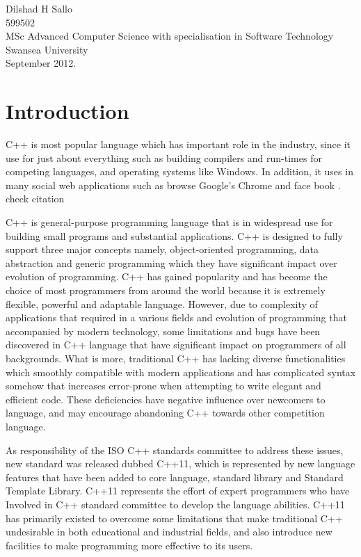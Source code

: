 \documentclass[11pt]{report}
\begin{document}
\begin{flushright}
Dilshad H Sallo\\
599502\\
MSc Advanced Computer Science with specialisation in Software Technology\\
Swansea University\\
September 2012.
\end{flushright}

\tableofcontents

\chapter{Introduction}
\label{cha:intro}
C++ is most popular language which has important role in the industry, since it use for just about everything such as building compilers and run-times for competing languages, and operating systems like Windows. In addition, it uses in many social web applications such as browse Google’s Chrome and face book \cite{ISO:2011:Cpplanguage}.
check citation

C++ is general-purpose programming language that is in widespread use for building small programs and substantial applications. C++ is designed to fully support three major concepts namely, object-oriented programming, data abstraction and generic programming which they have significant impact over evolution of programming. C++ has gained popularity and has become the choice of most programmers from around the world because it is extremely flexible, powerful and adaptable language. However, due to complexity of applications that required in a various fields and evolution of programming that accompanied by modern technology, some limitations and bugs have been discovered in C++ language that have significant impact on programmers of all backgrounds.  What is more, traditional C++ has lacking diverse functionalities which smoothly compatible with modern applications and has complicated syntax somehow that increases error-prone when attempting to write elegant and efficient code.  These deficiencies have negative influence over newcomers to language, and may encourage abandoning C++ towards other competition language. 

As responsibility of the ISO C++ standards committee to address these issues, new standard was released dubbed C++11, which is represented by new language features that have been added to core language, standard library and Standard Template Library. C++11 represents the effort of expert programmers who have Involved in C++ standard committee to develop the language abilities. C++11 has primarily existed to overcome some limitations that make traditional C++  undesirable in both educational and industrial fields, and also introduce new facilities to make programming more effective to its users. 
\end{document}
